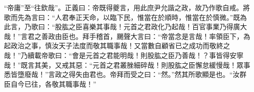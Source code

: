{\noindent\shu{}\fzkt “帝庸”至“往欽哉”。正義曰：帝既得夔言，用此庶尹允諧之政，故乃作歌自戒。將歌而先為言曰：“人君奉正天命，以臨下民，惟當在於順時，惟當在於慎微。”既為此言，乃歌曰：“股肱之臣喜樂其事哉！元首之君政化乃起哉！百官事業乃得廣大哉！”言君之善政由臣也。拜手稽首，颺聲大言曰：“帝當念是言哉！率領臣下，為起政治之事，慎汝天子法度而敬其職事哉！又當數自顧省已之成功而敬終之哉！”乃續載帝歌曰：“會是元首之君能明哉！則股肱之臣乃善哉！？事皆得安寧哉！”既言其美，又戒其惡：“元首之君叢脞細碎哉！則股肱之臣懈怠緩慢哉！眾事悉皆墮廢哉！”言政之得失由君也。帝拜而受之曰：“然。”然其所歌顯是也。“汝群臣自今已往，各敬其職事哉！” \par}

